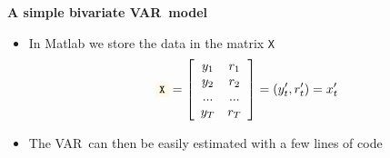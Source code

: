 \documentclass[10pt,english,t,aspectratio=169,ignorenonframetext]{beamer}
\begin{document}

\begin{frame}
{\textbf{A simple bivariate VAR\ model}}\medskip

\begin{itemize}
\item In Matlab we store the data in the matrix \colorbox{script!80}{\small%
\texttt{X}}%
\begin{equation*}
\text{\colorbox{script!80}{\small\texttt{X}}}=\left[ 
\begin{array}{cc}
y_{1} & r_{1} \\ 
y_{2} & r_{2} \\ 
... & ... \\ 
y_{T} & r_{T}%
\end{array}%
\right] =\left( y_{t}^{\prime },r_{t}^{\prime }\right) =x_{t}^{\prime }
\end{equation*}

\item The VAR\ can then be easily estimated with a few lines of code\medskip

\begin{minipage}[b]{.9\textwidth}
\end{minipage}
\end{itemize}
\end{frame}

\end{document}
